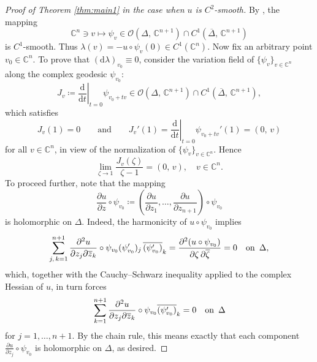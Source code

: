 \documentclass[12pt,a4paper]{amsart}
\numberwithin{equation}{section}
\theoremstyle{definition}
\newcommand{\dd}{\mathrm d}
\begin{document}
\begin{proof}[Proof of Theorem \ref{thm:main1} in the case when $u$ is $C^2$-smooth]
By \cite[Theorem A]{Wang24}, the mapping
\[
 \mathbb C^n\ni v\mapsto \psi_v\in \mathcal O(\Delta,\, \mathbb C^{n+1})\cap C^1(\overline\Delta,\,\mathbb C^{n+1})
\]
is $C^1$-smooth. Thus $\lambda(v)=-u\circ\psi_v(0)\in C^1(\mathbb C^n)$. Now fix an arbitrary point $v_0\in\mathbb C^n$. To prove that $(\dd\lambda)_{v_0}\equiv 0$, consider the variation field of $\{\psi_v\}_{v\in\mathbb C^n}$ along the complex geodesic $\psi_{v_0}$:
\[
 J_v \coloneqq \left.\frac{\dd}{\dd t}\right|_{t=0}\psi_{v_0+tv}\in\mathcal O(\Delta,\,\mathbb C^{n+1})\cap C^1(\overline\Delta, \,\mathbb C^{n+1}),
\]
which satisfies
\[
 J_v(1)=0  \qquad \text{and} \qquad  J_v'(1)=\left.\frac{\dd}{\dd t}\right|_{t=0}\psi_{v_0+tv}'(1)=(0,\, v)
\]
for all $v\in\mathbb C^n$, in view of the normalization of $\{\psi_v\}_{v\in\mathbb C^n}$. Hence
\begin{equation}\label{eq:asy-Jacobi}
 \lim_{\zeta\to1}\frac{J_v(\zeta)}{\zeta-1}=(0,\, v), \quad v\in\mathbb C^n.
\end{equation}
To proceed further, note that the mapping
\[
 \frac{\partial u}{\partial z}\circ\psi_{v_0} \coloneqq \left(\frac{\partial u}{\partial z_1},\ldots,
 \frac{\partial u}{\partial z_{n+1}}\right)\circ\psi_{v_0}
\]
is holomorphic on $\Delta$. Indeed, the harmonicity of $u\circ\psi_{v_0}$ implies
\[
 \sum_{j,\, k=1}^{n+1}
 \frac{\partial^2u}{\partial z_j\partial\overline z_k}\circ\psi_{v_0} (\psi_{v_0}')_j\, \overline{(\psi_{v_0}')}_k
 =\frac{\partial^2(u\circ\psi_{v_0})}{\partial\zeta\,\partial\overline\zeta}=0 \quad {\rm on }\ \, \Delta,
\]
which, together with the Cauchy--Schwarz inequality applied to the complex Hessian of $u$, in turn forces
\[
 \sum_{k=1}^{n+1}
 \frac{\partial^2u}{\partial z_j\partial\overline z_k}\circ\psi_{v_0} \overline{(\psi_{v_0}')}_k=0 \quad {\rm on }\ \, \Delta
\]
for $j=1,\ldots,n+1$. By the chain rule, this means exactly that each component $\frac{\partial u}{\partial z_j}\circ\psi_{v_0}$ is holomorphic on $\Delta$, as desired.


\end{proof}
\end{document}
